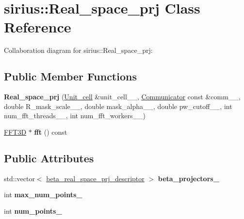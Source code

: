 \hypertarget{classsirius_1_1_real__space__prj}{}\section{sirius\+:\+:Real\+\_\+space\+\_\+prj Class Reference}
\label{classsirius_1_1_real__space__prj}


Collaboration diagram for sirius\+:\+:Real\+\_\+space\+\_\+prj\+:
\subsection*{Public Member Functions}
\begin{DoxyCompactItemize}
\item 
\hypertarget{classsirius_1_1_real__space__prj_ac3931b3788d6c56c27f400b143187552}{}{\bfseries Real\+\_\+space\+\_\+prj} (\hyperlink{classsirius_1_1_unit__cell}{Unit\+\_\+cell} \&unit\+\_\+cell\+\_\+\+\_\+, \hyperlink{classsddk_1_1_communicator}{Communicator} const \&comm\+\_\+\+\_\+, double R\+\_\+mask\+\_\+scale\+\_\+\+\_\+, double mask\+\_\+alpha\+\_\+\+\_\+, double pw\+\_\+cutoff\+\_\+\+\_\+, int num\+\_\+fft\+\_\+threads\+\_\+\+\_\+, int num\+\_\+fft\+\_\+workers\+\_\+\+\_\+)\label{classsirius_1_1_real__space__prj_ac3931b3788d6c56c27f400b143187552}

\item 
\hypertarget{classsirius_1_1_real__space__prj_a4f423ca1e1861eda096e6add40a8083b}{}\hyperlink{classsddk_1_1_f_f_t3_d}{F\+F\+T3\+D} $\ast$ {\bfseries fft} () const \label{classsirius_1_1_real__space__prj_a4f423ca1e1861eda096e6add40a8083b}

\end{DoxyCompactItemize}
\subsection*{Public Attributes}
\begin{DoxyCompactItemize}
\item 
\hypertarget{classsirius_1_1_real__space__prj_add5fef3c0a647502f6acdaf836e4b847}{}std\+::vector$<$ \hyperlink{structsirius_1_1beta__real__space__prj__descriptor}{beta\+\_\+real\+\_\+space\+\_\+prj\+\_\+descriptor} $>$ {\bfseries beta\+\_\+projectors\+\_\+}\label{classsirius_1_1_real__space__prj_add5fef3c0a647502f6acdaf836e4b847}

\item 
\hypertarget{classsirius_1_1_real__space__prj_a3dcf2fa42eadd6964b12cff11160e0fa}{}int {\bfseries max\+\_\+num\+\_\+points\+\_\+}\label{classsirius_1_1_real__space__prj_a3dcf2fa42eadd6964b12cff11160e0fa}

\item 
\hypertarget{classsirius_1_1_real__space__prj_a0559aba1bbe5f9882b36b4ac1dec469b}{}int {\bfseries num\+\_\+points\+\_\+}\label{classsirius_1_1_real__space__prj_a0559aba1bbe5f9882b36b4ac1dec469b}

\end{DoxyCompactItemize}
